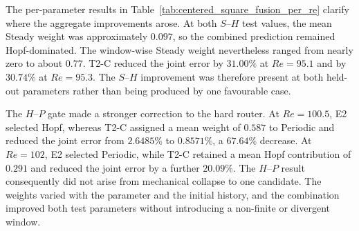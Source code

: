 The per-parameter results in
Table~\ref{tab:centered_square_fusion_per_re} clarify where the aggregate
improvements arose.  At both $S$--$H$ test values, the mean Steady weight was
approximately $0.097$, so the combined prediction remained Hopf-dominated.
The window-wise Steady weight nevertheless ranged from nearly zero to about
$0.77$.  T2-C reduced the joint error by $31.00\%$ at $Re=95.1$ and by
$30.74\%$ at $Re=95.3$.  The $S$--$H$ improvement was therefore present at
both held-out parameters rather than being produced by one favourable case.

The $H$--$P$ gate made a stronger correction to the hard router.  At
$Re=100.5$, E2 selected Hopf, whereas T2-C assigned a mean weight of $0.587$
to Periodic and reduced the joint error from $2.6485\%$ to $0.8571\%$, a
$67.64\%$ decrease.  At $Re=102$, E2 selected Periodic, while T2-C retained a
mean Hopf contribution of $0.291$ and reduced the joint error by a further
$20.09\%$.  The $H$--$P$ result consequently did not arise from mechanical
collapse to one candidate.  The weights varied with the parameter and the
initial history, and the combination improved both test parameters without
introducing a non-finite or divergent window.

\begin{table}[!htbp]
  \centering
  \caption{Per-parameter $K24$ fusion diagnostics.  For $S$--$H$,
  $\alpha_1=\alpha_S$; for $H$--$P$, $\alpha_1=\alpha_P$; and
  $\alpha_2=1-\alpha_1$.  Errors are percentages.}
  \label{tab:centered_square_fusion_per_re}
\end{table}

